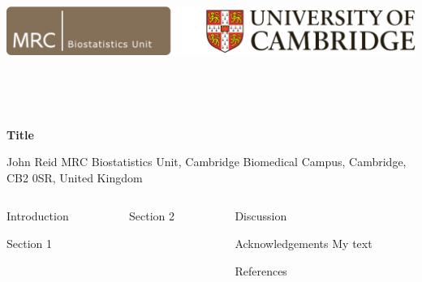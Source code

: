 \documentclass[t, final]{beamer}
\begin{document}
\begin{frame}{}

%
\begin{block}{
  \vspace{48pt}

  \includegraphics[height=150pt]{MRC_Biostatistics_Cambridge}

  \vspace{24pt}
}
  \vspace{24pt}

  \fontsize{82pt}{82pt}\selectfont \textcolor{mrcblue}{\textbf{Title}}

  \vspace{24pt}

  \fontsize{36pt}{36pt}\selectfont
  \textcolor{mrcblue}{
    John Reid
    \hspace{30pt}
    MRC Biostatistics Unit,
    Cambridge Biomedical Campus,
    Cambridge, CB2 0SR,
    United Kingdom}
\end{block}


%


%
\begin{columns}[t]
\begin{column}{.32\linewidth}
\begin{block}{Introduction}
  \blindtext
\end{block}

\begin{block}{Section 1}
  \blinditemize
\end{block}
\end{column}


\begin{column}{.32\linewidth}
\begin{block}{Section 2}
  \blindtext
\end{block}
\end{column}


\begin{column}{.32\linewidth}
\begin{block}{Discussion}
  \blindtext
\end{block}

\begin{block}{Acknowledgements}
  My text

  \blinditemize
\end{block}

\begin{block}{References}
  \blinditemize
\end{block}
\end{column}
\end{columns}

\end{frame}
\end{document}
